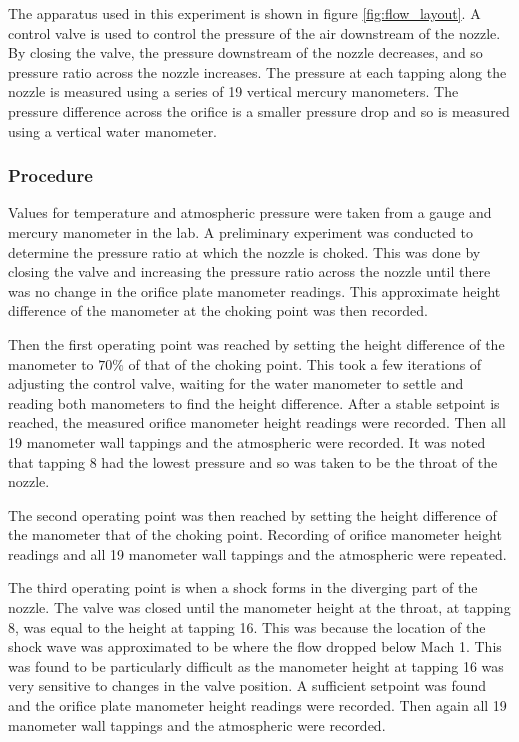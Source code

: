 \documentclass{article}
\begin{document}
The apparatus used in this experiment is shown in figure \ref{fig:flow_layout}.
A control valve is used to control the pressure of the air downstream of the nozzle. By closing the valve, the pressure downstream of the nozzle decreases, and so pressure ratio across the nozzle increases.
The pressure at each tapping along the nozzle is measured using a series of 19 vertical mercury manometers.
The pressure difference across the orifice is a smaller pressure drop and so is measured using a vertical water manometer.

\subsubsection{Procedure}

Values for temperature and atmospheric pressure were taken from a gauge and mercury manometer in the lab.
A preliminary experiment was conducted to determine the pressure ratio at which the nozzle is choked.
This was done by closing the valve and increasing the pressure ratio across the nozzle until there was no change in the orifice plate manometer readings.
This approximate height difference of the manometer at the choking point was then recorded.

Then the first operating point was reached by setting the height difference of the manometer to $70\%$ of that of the choking point.
This took a few iterations of adjusting the control valve, waiting for the water manometer to settle and reading both manometers to find the height difference.
After a stable setpoint is reached, the measured orifice manometer height readings were recorded. 
Then all 19 manometer wall tappings and the atmospheric were recorded.
It was noted that tapping 8 had the lowest pressure and so was taken to be the throat of the nozzle.

The second operating point was then reached by setting the height difference of the manometer that of the choking point.
Recording of orifice manometer height readings and all 19 manometer wall tappings and the atmospheric were repeated.

The third operating point is when a shock forms in the diverging part of the nozzle. The valve was closed until the manometer height at the throat, at tapping 8, was equal to the height at tapping 16.
This was because the location of the shock wave was approximated to be where the flow dropped below Mach 1.
This was found to be particularly difficult as the manometer height at tapping 16 was very sensitive to changes in the valve position.
A sufficient setpoint was found and the orifice plate manometer height readings were recorded.
Then again all 19 manometer wall tappings and the atmospheric were recorded.
\end{document}
